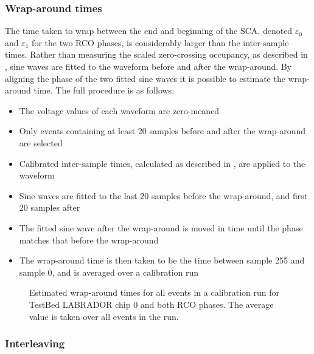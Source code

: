 \subsubsection{Wrap-around times}
\label{sec:calibration:LABRADOR-Digitiser-Chip:Wrap-around-times}

The time taken to wrap between the end and beginning of the SCA, denoted $\varepsilon_{0}$ and $\varepsilon_{1}$ for the two RCO phases, is considerably larger than the inter-sample times. Rather than measuring the scaled zero-crossing occupancy, as described in , sine waves are fitted to the waveform before and after the wrap-around. By aligning the phase of the two fitted sine waves it is possible to estimate the wrap-around time. The full procedure is as follows:

\begin{itemize}
\item The voltage values of each waveform are zero-meaned
\item Only events containing at least 20 samples before and after the wrap-around are selected
\item Calibrated inter-sample times, calculated as described in , are applied to the waveform 
\item Sine waves are fitted to the last 20 samples before the wrap-around, and first 20 samples after
\item The fitted sine wave after the wrap-around is moved in time until the phase matches that before the wrap-around
\item The wrap-around time is then taken to be the time between sample 255 and sample 0, and is averaged over a calibration run
\end{itemize}


\begin{figure}[htpb]
  \hfill
  \caption{Estimated wrap-around times for all events in a calibration run for TestBed LABRADOR chip 0 and both RCO phases. The average value is taken over all events in the run.}
  \label{fig:calibration:LABRADOR-Digitiser-Chip:Wrap-around}
\end{figure}


\subsubsection{Interleaving}
\label{sec:calibration:LABRADOR-Digitiser-Chip:Interleaving}

